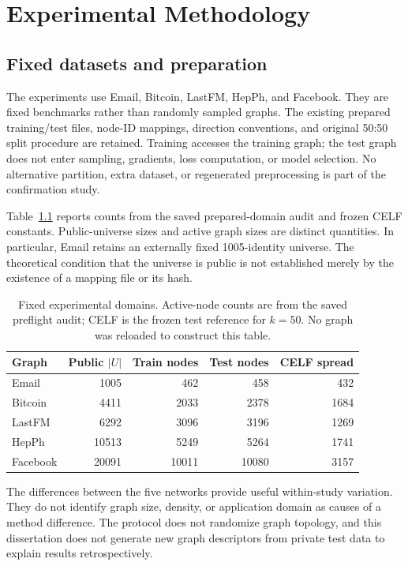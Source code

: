 \chapter{Experimental Methodology}\label{ch:design}
\section{Fixed datasets and preparation}
The experiments use Email, Bitcoin, LastFM, HepPh, and Facebook. They are fixed benchmarks rather than randomly sampled graphs. The existing prepared training/test files, node-ID mappings, direction conventions, and original 50:50 split procedure are retained. Training accesses the training graph; the test graph does not enter sampling, gradients, loss computation, or model selection. No alternative partition, extra dataset, or regenerated preprocessing is part of the confirmation study.

Table~\ref{tab:datasets} reports counts from the saved prepared-domain audit and frozen CELF constants. Public-universe sizes and active graph sizes are distinct quantities. In particular, Email retains an externally fixed 1005-identity universe. The theoretical condition that the universe is public is not established merely by the existence of a mapping file or its hash.

\begin{table}[htbp]
\centering\small
\caption{Fixed experimental domains. Active-node counts are from the saved preflight audit; CELF is the frozen test reference for $k=50$. No graph was reloaded to construct this table.}\label{tab:datasets}
\begin{tabular}{lrrrr}\toprule
Graph & Public $|U|$ & Train nodes & Test nodes & CELF spread\\\midrule
Email & 1005 & 462 & 458 & 432\\
Bitcoin & 4411 & 2033 & 2378 & 1684\\
LastFM & 6292 & 3096 & 3196 & 1269\\
HepPh & 10513 & 5249 & 5264 & 1741\\
Facebook & 20091 & 10011 & 10080 & 3157\\\bottomrule
\end{tabular}
\end{table}

The differences between the five networks provide useful within-study variation. They do not identify graph size, density, or application domain as causes of a method difference. The protocol does not randomize graph topology, and this dissertation does not generate new graph descriptors from private test data to explain results retrospectively.

